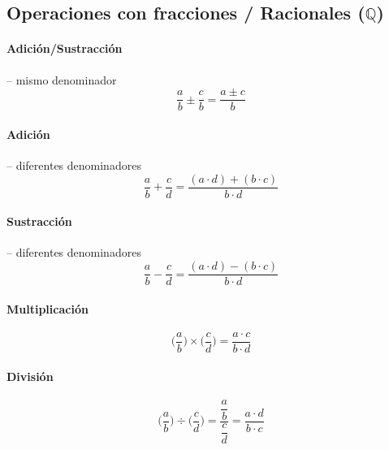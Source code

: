\documentclass[12pt, twocolumn, landscape, a4paper]{article}
\begin{document}
\subsection*{Operaciones con fracciones / Racionales ($\mathbb{Q}$)}

\paragraph*{Adición/Sustracción} --  mismo denominador
$$
\dfrac{a}{b} \pm \dfrac{c}{b} = \dfrac{a \pm c}{b}
$$

\paragraph*{Adición} -- diferentes denominadores
$$
\dfrac{a}{b} + \dfrac{c}{d} = \dfrac{(a \cdot d) + (b \cdot c)}{b \cdot d}
$$

\paragraph*{Sustracción} -- diferentes denominadores
$$
\dfrac{a}{b} - \dfrac{c}{d} = \dfrac{(a \cdot d) - (b \cdot c)}{b \cdot d}
$$

\paragraph*{Multiplicación}
$$
\Big(\dfrac{a}{b}\Big) \times \Big(\dfrac{c}{d}\Big) = \dfrac{a \cdot c}{b \cdot d}
$$

\paragraph*{División}
$$
\Big(\dfrac{a}{b}\Big) \div \Big(\dfrac{c}{d}\Big) = \dfrac{\dfrac{a}{b}}{\dfrac{c}{d}} = \dfrac{a \cdot d}{b \cdot c}
$$
\end{document}
